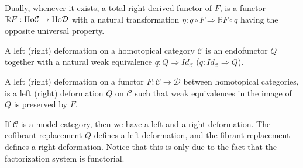 \documentclass[../thesis.tex]{subfiles}
\begin{document}
\begin{definition}
                Dually, whenever it exists, a total right derived functor of $F$, is a functor $\mathbb{R}F:\tt{Ho}\mathcal{C}\rightarrow \tt{Ho}\mathcal{D}$ with a natural transformation $\eta :q\circ F \Rightarrow \mathbb{R}F \circ q$ having the opposite universal property.
                \begin{center}
                    \qquad
                \end{center}
            \end{definition}

            \begin{definition}[Deformation]
                A left (right) deformation on a homotopical category $\mathcal{C}$ is an endofunctor $Q$ together with a natural weak equivalence $q:Q \Rightarrow Id_\mathcal{C}$ ($q:Id_\mathcal{C}\Rightarrow Q$).

                A left (right) deformation on a functor $F:\mathcal{C}\rightarrow\mathcal{D}$ between homotopical categories, is a left (right) deformation $Q$ on $\mathcal{C}$ such that weak equivalences in the image of $Q$ is preserved by $F$.
            \end{definition}

            \begin{remark}
                If $\mathcal{C}$ is a model category, then we have a left and a right deformation. The cofibrant replacement $Q$ defines a left deformation, and the fibrant replacement defines a right deformation. Notice that this is only due to the fact that the factorization system is functorial.
            \end{remark}
\end{document}
